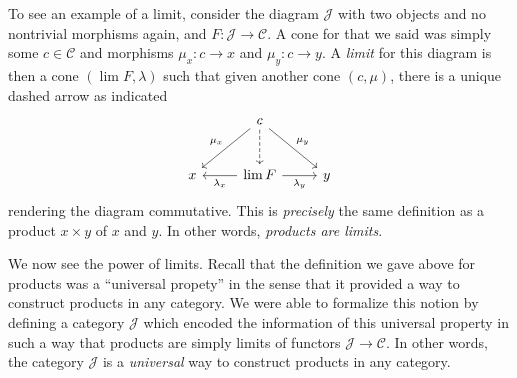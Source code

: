 \documentclass[11pt, A4]{article}
\begin{document}
	To see an example of a limit, consider the diagram $\mathcal{J} $ with two objects and no nontrivial morphisms again, and $F : \mathcal{J}  \to \mathcal{C} $. A cone for that we said was simply some $c\in \mathcal{C} $ and morphisms $\mu _x : c \to x$ and $\mu_y : c \to y$. A \emph{limit} for this diagram is then a cone $(\lim F,\lambda )$ such that given another cone $(c,\mu )$, there is a unique dashed arrow as indicated
	\[\begin{tikzcd}[row sep = 2.5em, column sep = 2.5em]
	 & c \ar[" \mu _y ", dr] \ar[" \mu _x "', dl] \ar[dashed, d]  &  \\
	x & \lim F \ar[" \lambda_x ", l] \ar[" \lambda _y "', r] & y
	\end{tikzcd}\]
	rendering the diagram commutative. This is \emph{precisely} the same definition as a product $x\times y$ of $x$ and $y$. In other words, \emph{products are limits}.

	We now see the power of limits. Recall that the definition we gave above for products was a ``universal propety'' in the sense that it provided a way to construct products in any category. We were able to formalize this notion by defining a category $\mathcal{J} $ which encoded the information of this universal property in such a way that products are simply limits of functors $\mathcal{J} \to \mathcal{C} $. In other words, the category $\mathcal{J} $ is a \emph{universal} way to construct products in any category.
\end{document}
